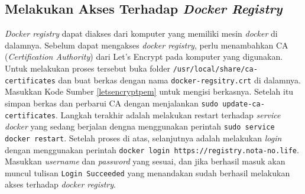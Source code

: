         \subsection{Melakukan Akses Terhadap \textit{Docker Registry}}
        	\textit{Docker registry} dapat diakses dari komputer yang memiliki mesin \textit{docker} di dalamnya. Sebelum dapat mengakses \textit{docker registry}, perlu menambahkan CA (\textit{Certification Authority}) dari Let's Encrypt pada komputer yang digunakan. Untuk melakukan proses tersebut buka folder \texttt{/usr/local/share/ca-certificates} dan buat berkas dengan nama \texttt{docker-regsitry.crt} di dalamnya. Masukkan Kode Sumber \ref{letsencryptpem} untuk mengisi berkasnya. Setelah itu simpan berkas dan perbarui CA dengan menjalankan \texttt{sudo update-ca-certificates}. Langkah terakhir adalah melakukan restart terhadap \textit{service docker} yang sedang berjalan dengna menggunakan perintah \texttt{sudo service docker restart}. Setelah proses di atas, selanjutnya adalah melakukan \textit{login} dengan menggunakan perintah \texttt{docker login https://registry.nota-no.life}. Masukkan \textit{username} dan \textit{password} yang sesuai, dan jika berhasil masuk akan muncul tulisan \texttt{Login Succeeded} yang menandakan sudah berhasil melakukan akses terhadap \textit{docker registry}.
            
